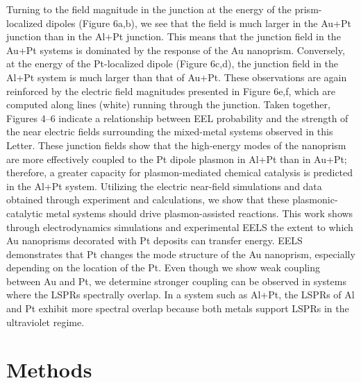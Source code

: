 \documentclass [11pt, proquest] {uwthesis}[2016/11/22]
\begin{document}
Turning to the field magnitude in the junction at the energy of the prism-localized dipoles (Figure 6a,b), we see that the field is much larger in the Au+Pt junction than in the Al+Pt junction. This means that the junction field in the Au+Pt systems is dominated by the response of the Au nanoprism. Conversely, at the energy of the Pt-localized dipole (Figure 6c,d), the junction field in the Al+Pt system is much larger than that of Au+Pt. These observations are again reinforced by the electric field magnitudes presented in Figure 6e,f, which are computed along lines (white) running through the junction. Taken together, Figures 4–6 indicate a relationship between EEL probability and the strength of the near electric fields surrounding the mixed-metal systems observed in this Letter. These junction fields show that the high-energy modes of the nanoprism are more effectively coupled to the Pt dipole plasmon in Al+Pt than in Au+Pt; therefore, a greater capacity for plasmon-mediated chemical catalysis is predicted in the Al+Pt system. Utilizing the electric near-field simulations and data obtained through experiment and calculations, we show that these plasmonic-catalytic metal systems should drive plasmon-assisted reactions.
This work shows through electrodynamics simulations and experimental EELS the extent to which Au nanoprisms decorated with Pt deposits can transfer energy. EELS demonstrates that Pt changes the mode structure of the Au nanoprism, especially depending on the location of the Pt. Even though we show weak coupling between Au and Pt, we determine stronger coupling can be observed in systems where the LSPRs spectrally overlap. In a system such as Al+Pt, the LSPRs of Al and Pt exhibit more spectral overlap because both metals support LSPRs in the ultraviolet regime.

\section{Methods}
\end{document}
